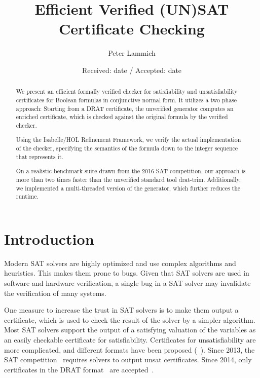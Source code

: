 \documentclass[smallcondensed]{svjour3}     %
\begin{document}
\title{Efficient Verified (UN)SAT Certificate Checking}

\author{Peter Lammich}


\date{Received: date / Accepted: date}

\maketitle

\begin{abstract}
We present an efficient formally verified checker for satisfiability and unsatisfiability certificates for 
Boolean formulas in conjunctive normal form. 
It utilizes a two phase approach: Starting from a DRAT certificate, the unverified generator computes an enriched certificate,
which is checked against the original formula by the verified checker.

Using the Isabelle/HOL Refinement Framework, we verify the actual implementation of the checker, specifying the semantics of the formula down to the integer sequence that represents it.

On a realistic benchmark suite drawn from the 2016 SAT competition, our approach is more than two times faster than the unverified standard tool drat-trim.
Additionally, we implemented a multi-threaded version of the generator, which further reduces the runtime.
\end{abstract}




\section{Introduction}
Modern SAT solvers are highly optimized and use complex algorithms and heuristics. This makes them prone to bugs.
Given that SAT solvers are used in software and hardware verification, a single bug in a SAT solver may 
invalidate the verification of many systems.

One measure to increase the trust in SAT solvers is to make them output a certificate, which is used to check 
the result of the solver by a simpler algorithm. 
Most SAT solvers support the output of a satisfying valuation of the variables as an easily checkable certificate for satisfiability.
Certificates for unsatisfiability are more complicated, and different formats have been proposed (\eg~\cite{SiBi06,WHH13,WHH14}).
Since 2013, the SAT competition~\cite{satcomp-2013} requires solvers to output unsat certificates.
Since 2014, only certificates in the DRAT format~\cite{WHH14} are accepted~\cite{satcomp-2014}.
\end{document}
